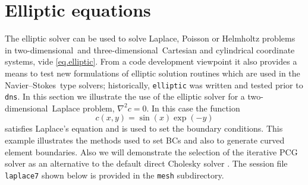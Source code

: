 \documentclass[11pt]{report}
\newcommand\twod{two-di\-men\-sion\-al}
\newcommand\threed{three-di\-men\-sion\-al}
\newcommand\NavSto{Navier--Stokes}
\begin{document}
\section{Elliptic equations}
\label{sec.laplace}

The elliptic solver can be used to solve Laplace, Poisson or Helmholtz
problems in \twod\ and \threed\ Cartesian and cylindrical coordinate
systems, vide \eqref{eq.elliptic}.  From a code development viewpoint
it also provides a means to test new formulations of elliptic solution
routines which are used in the \NavSto\ type solvers; historically,
\verb|elliptic| was written and tested prior to \verb|dns|.
%
In this section we illustrate the use of the elliptic solver for a \twod\
Laplace problem, $\nabla^2 c = 0$.  In this case the function
\begin{equation}
  c(x,y) = \sin(x) \exp(-y)
\end{equation}
satisfies Laplace's equation and is used to set the boundary
conditions.  This example illustrates the methods used to set BCs and
also to generate curved element boundaries.  Also we will demonstrate
the selection of the iterative PCG solver \citep{barrett94} as an
alternative to the default direct Cholesky solver
\citep{anderson99}. The session file \texttt{laplace7} shown below is
provided in the \verb|mesh| subdirectory.
%
\end{document}
